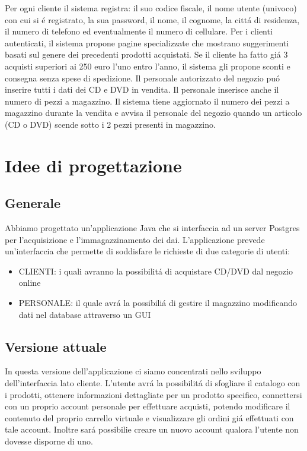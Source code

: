 \documentclass[a4paper,titlepage]{book}
\begin{document}
Per ogni cliente il sistema registra: il suo codice fiscale, il nome utente (univoco) con cui si \'e registrato,
la sua password, il nome, il cognome, la citt\'a di residenza, il numero di telefono ed eventualmente il
numero di cellulare.
Per i clienti autenticati, il sistema propone pagine specializzate che mostrano suggerimenti basati sul
genere dei precedenti prodotti acquistati.
Se il cliente ha fatto gi\'a 3 acquisti superiori ai 250 euro l’uno entro l’anno, il sistema gli propone sconti e
consegna senza spese di spedizione.
Il personale autorizzato del negozio pu\'o inserire tutti i dati dei CD e DVD in vendita. Il personale
inserisce anche il numero di pezzi a magazzino. Il sistema tiene aggiornato il numero dei pezzi a
magazzino durante la vendita e avvisa il personale del negozio quando un articolo (CD o DVD) scende
sotto i 2 pezzi presenti in magazzino.

\chapter{Idee di progettazione}
\section{Generale}
Abbiamo progettato un'applicazione Java che si interfaccia ad un server Postgres per l'acquisizione e
l'immagazzinamento dei dai. L'applicazione prevede un'interfaccia che permette di soddisfare le richieste
di due categorie di utenti:
\begin{itemize}
\item CLIENTI: i quali avranno la possibilit\'a di acquistare CD/DVD dal negozio online
\item PERSONALE: il quale avr\'a la possibili\'a di gestire il magazzino modificando dati nel database attraverso un GUI
\end{itemize}

\section{Versione attuale}
In questa versione dell'applicazione ci siamo concentrati nello sviluppo dell'interfaccia lato cliente.
L'utente avr\'a la possibilit\'a di sfogliare il catalogo con i prodotti, ottenere informazioni dettagliate per un prodotto
specifico, connettersi con un proprio account personale per effettuare acquisti, potendo modificare il contenuto 
del proprio carrello virtuale e visualizzare gli ordini gi\'a effettuati con tale account. Inoltre sar\'a possibilie creare un nuovo account qualora l'utente non dovesse disporne di uno.
\end{document}
